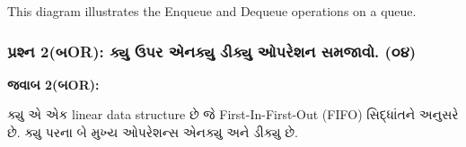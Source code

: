 This diagram illustrates the Enqueue and Dequeue operations on a queue.

\hypertarget{uxaaauxab0uxab6uxaa8-2uxaacor-uxa95uxaaf-uxa89uxaaauxab0-uxa8fuxaa8uxa95uxaaf-uxaa1uxa95uxaaf-uxa93uxaaauxab0uxab6uxaa8-uxab8uxaaeuxa9cuxab5.-uxae6uxaea}{%
\subsubsection{પ્રશ્ન 2(બOR): ક્યુ ઉપર એનક્યુ ડીક્યુ ઓપરેશન સમજાવો.
(૦૪)}\label{uxaaauxab0uxab6uxaa8-2uxaacor-uxa95uxaaf-uxa89uxaaauxab0-uxa8fuxaa8uxa95uxaaf-uxaa1uxa95uxaaf-uxa93uxaaauxab0uxab6uxaa8-uxab8uxaaeuxa9cuxab5.-uxae6uxaea}}

\textbf{જવાબ 2(બOR):}

ક્યુ એ એક linear data structure છે જે First-In-First-Out (FIFO) સિદ્ધાંતને અનુસરે
છે. ક્યુ પરના બે મુખ્ય ઓપરેશન્સ એનક્યુ અને ડીક્યુ છે.

